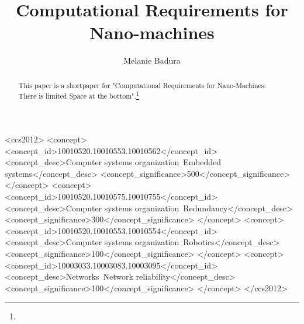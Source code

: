 \documentclass[10pt,sigconf]{acmart}
\begin{document}
\title{Computational Requirements for Nano-machines}

\author{Melanie Badura}




\renewcommand{\shortauthors}{F. Lastname et al.}


\begin{abstract}
This paper is a shortpaper for "Computational Requirements for 
Nano-Machines: There is limited Space at the bottom".\footnote{}
\end{abstract}

%
%
\begin{CCSXML}
<ccs2012>
 <concept>
  <concept_id>10010520.10010553.10010562</concept_id>
  <concept_desc>Computer systems organization~Embedded systems</concept_desc>
  <concept_significance>500</concept_significance>
 </concept>
 <concept>
  <concept_id>10010520.10010575.10010755</concept_id>
  <concept_desc>Computer systems organization~Redundancy</concept_desc>
  <concept_significance>300</concept_significance>
 </concept>
 <concept>
  <concept_id>10010520.10010553.10010554</concept_id>
  <concept_desc>Computer systems organization~Robotics</concept_desc>
  <concept_significance>100</concept_significance>
 </concept>
 <concept>
  <concept_id>10003033.10003083.10003095</concept_id>
  <concept_desc>Networks~Network reliability</concept_desc>
  <concept_significance>100</concept_significance>
 </concept>
</ccs2012>  
\end{CCSXML}






\maketitle
\end{document}
